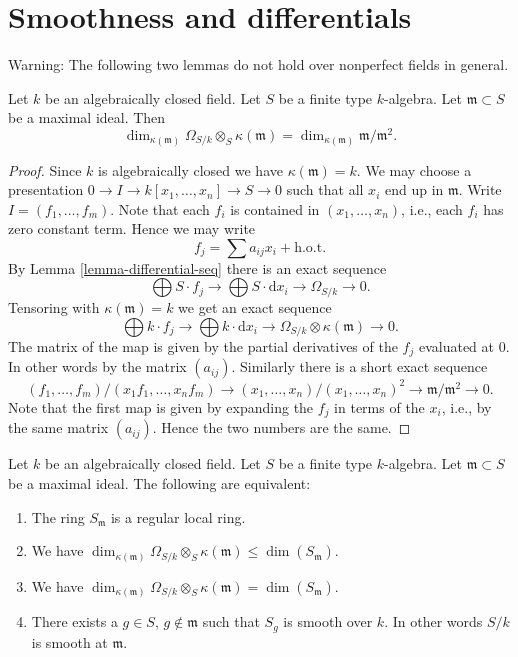 \section{Smoothness and differentials}
\label{section-smooth-differential}

\noindent
Warning: The following two lemmas do not hold over nonperfect
fields in general.

\begin{lemma}
\label{lemma-rank-omega}
Let $k$ be an algebraically closed field.
Let $S$ be a finite type $k$-algebra.
Let $\mathfrak m \subset S$ be a maximal ideal.
Then
$$
\dim_{\kappa(\mathfrak m)} \Omega_{S/k} \otimes_S \kappa(\mathfrak m)
=
\dim_{\kappa(\mathfrak m)} \mathfrak m/\mathfrak m^2.
$$
\end{lemma}

\begin{proof}
Since $k$ is algebraically closed we have $\kappa(\mathfrak m) = k$.
We may choose a presentation
$0 \to I \to k[x_1, \ldots, x_n] \to S\to 0$ such that
all $x_i$ end up in $\mathfrak m$. Write $I = (f_1, \ldots, f_m)$.
Note that each $f_i$ is contained in $(x_1, \ldots, x_n)$, i.e., each
$f_i$ has zero constant term. Hence we may write
$$
f_j = \sum a_{ij} x_i + \text{h.o.t.}
$$
By Lemma \ref{lemma-differential-seq} there is an exact sequence
$$
\bigoplus S \cdot f_j
\to
\bigoplus S \cdot \text{d}x_i
\to 
\Omega_{S/k}
\to 
0.
$$
Tensoring with $\kappa(\mathfrak m) = k$ we get
an exact sequence
$$
\bigoplus k \cdot f_j
\to
\bigoplus k \cdot \text{d}x_i
\to 
\Omega_{S/k} \otimes \kappa(\mathfrak m)
\to 
0.
$$
The matrix of the map is given by the partial derivatives of
the $f_j$ evaluated at $0$. In other words by the matrix $(a_{ij})$.
Similarly there is a short exact sequence
$$
(f_1, \ldots, f_m)/(x_1 f_1, \ldots, x_n f_m)
\to
(x_1, \ldots, x_n)/(x_1, \ldots, x_n)^2
\to
\mathfrak m/\mathfrak m^2
\to
0.
$$
Note that the first map is given by expanding the $f_j$
in terms of the $x_i$, i.e., by the same matrix $(a_{ij})$.
Hence the two numbers are the same.
\end{proof}

\begin{lemma}
\label{lemma-characterize-smooth-kbar}
Let $k$ be an algebraically closed field.
Let $S$ be a finite type $k$-algebra.
Let $\mathfrak m \subset S$ be a maximal ideal.
The following are equivalent:
\begin{enumerate}
\item The ring $S_{\mathfrak m}$ is a regular local ring.
\item We have
$\dim_{\kappa(\mathfrak m)} \Omega_{S/k} \otimes_S \kappa(\mathfrak m)
\leq \dim(S_{\mathfrak m})$.
\item We have
$\dim_{\kappa(\mathfrak m)} \Omega_{S/k} \otimes_S \kappa(\mathfrak m)
= \dim(S_{\mathfrak m})$.
\item There exists a $g \in S$, $g \not \in \mathfrak m$
such that $S_g$ is smooth over $k$. In other words $S/k$
is smooth at $\mathfrak m$.
\end{enumerate}
\end{lemma}

